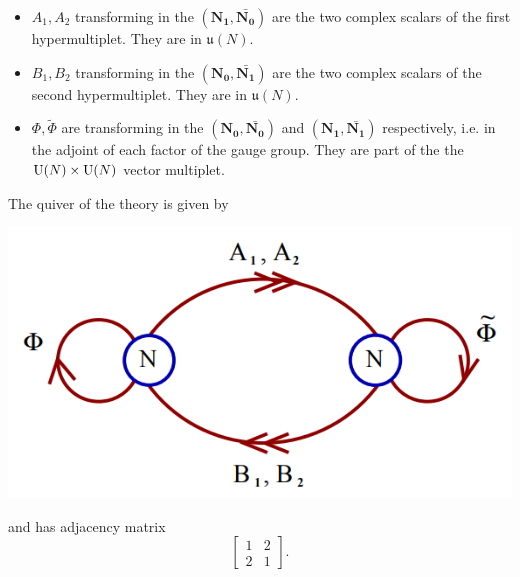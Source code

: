         \begin{itemize}
            \item $A_1,A_2$ transforming in the $(\boldsymbol{N_1},\bar{\boldsymbol{N_0}})$ are the two complex scalars of the first hypermultiplet. They are in $\mathfrak{u}(N)$.
            \item $B_1,B_2$ transforming in the $(\boldsymbol{N_0},\bar{\boldsymbol{N_1}})$ are the two complex scalars of the second hypermultiplet. They are in $\mathfrak{u}(N)$.
            \item $\Phi,\tilde{\Phi}$ are transforming in the $(\boldsymbol{N_0},\bar{\boldsymbol{N_0}})$ and $(\boldsymbol{N_1},\bar{\boldsymbol{N_1}})$ respectively, i.e. in the adjoint of each factor of the gauge group. They are part of the the $\text{U}(N)\times\text{U}(N)$ vector multiplet.
        \end{itemize}

        The quiver of the theory is given by
        \begin{center}
            \includegraphics[scale=0.35]{Pictures/A1quiver.png}
        \end{center}
        and has adjacency matrix
        \begin{equation}
            \begin{bmatrix}
                1 & 2 \\
                2 & 1
            \end{bmatrix}.  
        \end{equation}

